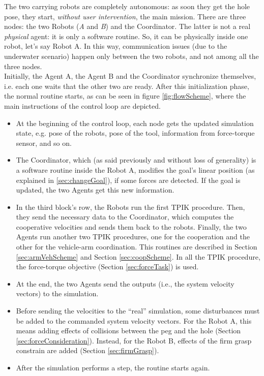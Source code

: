 The two carrying robots are completely autonomous: as soon they get the hole pose, they start, \textit{without user intervention}, the main mission. There are three nodes: the two Robots (\textit{A} and \textit{B}) and the Coordinator. The latter is not a real \textit{physical} agent: it is only a software routine. So, it can be physically inside one robot, let's say Robot A. In this way, communication issues (due to the underwater scenario) happen only between the two robots, and not among all the three nodes.\\
Initially, the Agent A, the Agent B and the Coordinator synchronize themselves, i.e. each one waits that the other two are ready. After this initialization phase, the normal routine starts, as can be seen in figure \ref{fig:flowScheme}, where the main instructions of the control loop are depicted.
\begin{itemize}
	\item At the beginning of the control loop, each node gets the updated simulation state, e.g. pose of the robots, pose of the tool, information from force-torque sensor, and so on.
	
	\item The Coordinator, which (as said previously and without loss of generality) is a software routine inside the Robot A, modifies the goal's linear position (as explained in \ref{sec:changeGoal}), if some forces are detected. If the goal is updated, the two Agents get this new information.
	
	\item In the third block's row, the Robots run the first TPIK procedure. Then, they send the necessary data to the Coordinator, which computes the cooperative velocities and sends them back to the robots. Finally, the two Agents run another two TPIK procedures, one for the cooperation and the other for the vehicle-arm coordination. This routines are described in Section \ref{sec:armVehScheme} and Section \ref{sec:coopScheme}. In all the TPIK procedure, the force-torque objective (Section \ref{sec:forceTask}) is used.
	
	\item At the end, the two Agents send the outputs (i.e., the system velocity vectors) to the simulation.
	
	\item Before sending the velocities to the \enquote{real} simulation, some disturbances must be added to the commanded system velocity vectors. For the Robot A, this means adding effects of collisions between the peg and the hole (Section \ref{sec:forceConsideration}). Instead, for the Robot B, effects of the firm grasp constrain are added (Section \ref{sec:firmGrasp}).
	
	\item After the simulation performs a step, the routine starts again.
	
\end{itemize}
